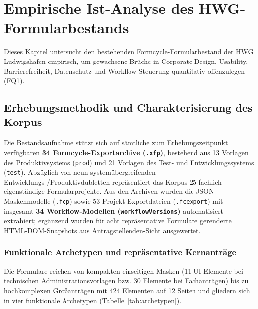 \chapter{Empirische Ist-Analyse des HWG-Formularbestands}
\label{chap:ist_analyse}

Dieses Kapitel untersucht den bestehenden Formcycle-Formularbestand der HWG Ludwigshafen empirisch, um gewachsene Brüche in Corporate Design, Usability, Barrierefreiheit, Datenschutz und Workflow-Steuerung quantitativ offenzulegen (FQ1).

\section{Erhebungsmethodik und Charakterisierung des Korpus}
\label{sec:methodik_korpus}

Die Bestandsaufnahme stützt sich auf sämtliche zum Erhebungszeitpunkt verfügbaren \textbf{34 Formcycle-Exportarchive (\texttt{.xfp})}, bestehend aus 13 Vorlagen des Produktivsystems (\texttt{prod}) und 21 Vorlagen des Test- und Entwicklungssystems (\texttt{test}). Abzüglich von neun systemübergreifenden Entwicklungs-/Produktivdubletten repräsentiert das Korpus 25 fachlich eigenständige Formularprojekte. Aus den Archiven wurden die JSON-Maskenmodelle (\texttt{.fcp}) sowie 53 Projekt-Exportdateien (\texttt{.fcexport}) mit insgesamt \textbf{34 Workflow-Modellen (\texttt{workflowVersions})} automatisiert extrahiert; ergänzend wurden für acht repräsentative Formulare gerenderte HTML-DOM-Snapshots aus Antragstellenden-Sicht ausgewertet.

\subsection{Funktionale Archetypen und repräsentative Kernanträge}
\label{subsec:archetypen}

Die Formulare reichen von kompakten einseitigen Masken (11 UI-Elemente bei technischen Administrationsvorlagen bzw. 30 Elemente bei Fachanträgen) bis zu hochkomplexen Großanträgen mit 424 Elementen auf 12 Seiten und gliedern sich in vier funktionale Archetypen (Tabelle~\ref{tab:archetypen}).

